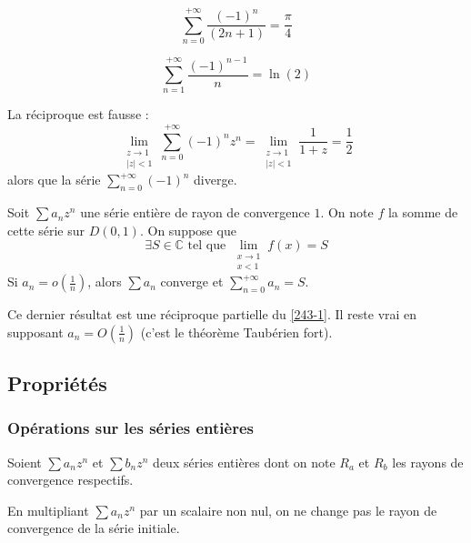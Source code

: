   \begin{application}
    \[ \sum_{n=0}^{+\infty} \frac{(-1)^n}{(2n+1)} = \frac{\pi}{4} \]
  \end{application}

  \begin{application}
    \[ \sum_{n=1}^{+\infty} \frac{(-1)^{n-1}}{n} = \ln(2) \]
  \end{application}

  \begin{cexample}
    La réciproque est fausse :
    \[ \lim_{\substack{z \rightarrow 1 \\ \vert z \vert < 1}} \sum_{n=0}^{+\infty} (-1)^n z^n = \lim_{\substack{z \rightarrow 1 \\ \vert z \vert < 1}} \frac{1}{1+z} = \frac{1}{2} \]
    alors que la série $\sum_{n=0}^{+\infty} (-1)^n$ diverge.
  \end{cexample}

  \begin{theorem}
    Soit $\sum a_n z^n$ une série entière de rayon de convergence $1$. On note $f$ la somme de cette série sur $D(0,1)$. On suppose que
    \[ \exists S \in \mathbb{C} \text{ tel que } \lim_{\substack{x \rightarrow 1 \\ x < 1}} f(x) = S \]
    Si $a_n = o \left( \frac{1}{n} \right)$, alors $\sum a_n$ converge et $\sum_{n=0}^{+\infty} a_n = S$.
  \end{theorem}

  \begin{remark}
    Ce dernier résultat est une réciproque partielle du \cref{243-1}. Il reste vrai en supposant $a_n = O \left( \frac{1}{n} \right)$ (c'est le théorème Taubérien fort).
  \end{remark}

  \subsection{Propriétés}

  \subsubsection{Opérations sur les séries entières}


  Soient $\sum a_n z^n$ et $\sum b_n z^n$ deux séries entières dont on note $R_a$ et $R_b$ les rayons de convergence respectifs.

  \begin{proposition}
    En multipliant $\sum a_n z^n$ par un scalaire non nul, on ne change pas le rayon de convergence de la série initiale.
  \end{proposition}

